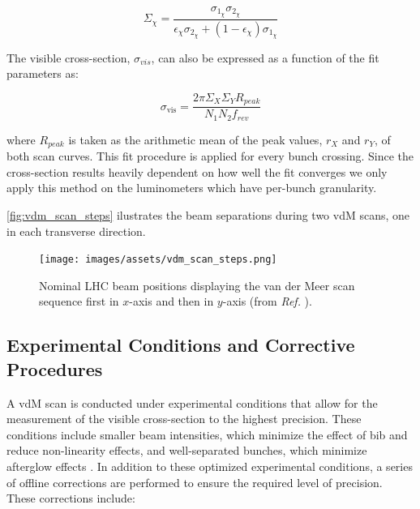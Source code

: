 {\begin{equation}
    \Sigma_{\chi} = \frac{\sigma_{1_{\chi}}\sigma_{2_{\chi}}}{\epsilon_{\chi}\sigma_{2_{\chi}} + \left( 1 - \epsilon_{\chi}\right) \sigma_{1_{\chi}}}
\end{equation}

The visible cross-section, $\sigma_{vis}$, can also be expressed as a function of the fit parameters as:

\begin{equation}
    \sigma_{\mathrm{vis}} =  \frac{2\pi \Sigma_{X} \Sigma_{Y} R_{peak}}{N_1 N_2 f_{rev}}
    \label{eq:calibration_from_fit_parameters}
\end{equation}

where $R_{peak}$ is taken as the arithmetic mean of the peak values, $r_X$ and $r_Y$, of both scan curves. This fit procedure is applied for every bunch crossing. Since the cross-section results heavily dependent on how well the fit converges we only apply this method on the luminometers which have per-bunch granularity.

\autoref{fig:vdm_scan_steps} ilustrates the beam separations during two vdM scans, one in each transverse direction.

\begin{figure}[!htb]
	\centering
	\texttt{[image: images/assets/vdm\_scan\_steps.png]}
	\caption[Example vdM scan sequence positions]{Nominal LHC beam positions displaying the van der Meer scan sequence first in $x$-axis and then in $y$-axis (from \textit{Ref.} \cite{Saariokari:2826125}).}
	\label{fig:vdm_scan_steps}
\end{figure}

\subsection{Experimental Conditions and Corrective Procedures}
\label{sec:experiment_conditions_and_corrective_procedures}

A vdM scan is conducted under experimental conditions that allow for the measurement of the visible cross-section to the highest precision. These conditions include smaller beam intensities, which minimize the effect of \acrshort{bib} and reduce non-linearity effects, and well-separated bunches, which minimize afterglow effects \cite{GRAFSTROM201597}. In addition to these optimized experimental conditions, a series of offline corrections are performed to ensure the required level of precision. These corrections include:

}
